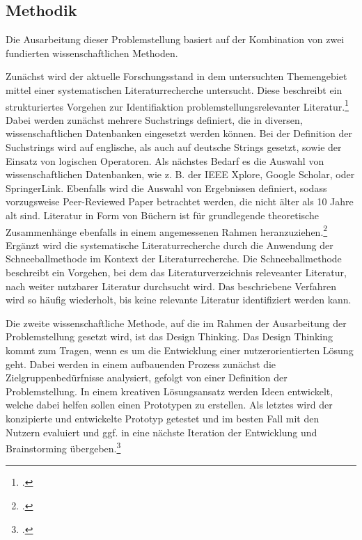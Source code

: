 \subsection{Methodik}
Die Ausarbeitung dieser Problemstellung basiert auf der Kombination von zwei fundierten wissenschaftlichen Methoden.

Zunächst wird der aktuelle Forschungsstand in dem untersuchten Themengebiet mittel einer systematischen Literaturrecherche untersucht.
Diese beschreibt ein strukturiertes Vorgehen zur Identifiaktion problemstellungsrelevanter Literatur.\footcite{brocke2015standing}
Dabei werden zunächst mehrere Suchstrings definiert, die in diversen, wissenschaftlichen Datenbanken eingesetzt werden können.
Bei der Definition der Suchstrings wird auf englische, als auch auf deutsche Strings gesetzt, sowie der Einsatz von logischen Operatoren.
Als nächstes Bedarf es die Auswahl von wissenschaftlichen Datenbanken, wie z. B. der IEEE Xplore, Google Scholar, oder SpringerLink.
Ebenfalls wird die Auswahl von Ergebnissen definiert, sodass vorzugsweise Peer-Reviewed Paper betrachtet werden, die nicht älter als 10 Jahre alt sind.
Literatur in Form von Büchern ist für grundlegende theoretische Zusammenhänge ebenfalls in einem angemessenen Rahmen heranzuziehen.\footcite{xiao2019guidance}
Ergänzt wird die systematische Literaturrecherche durch die Anwendung der Schneeballmethode im Kontext der Literaturrecherche.
Die Schneeballmethode beschreibt ein Vorgehen, bei dem das Literaturverzeichnis releveanter Literatur, nach weiter nutzbarer Literatur durchsucht wird.
Das beschriebene Verfahren wird so häufig wiederholt, bis keine relevante Literatur identifiziert werden kann.

Die zweite wissenschaftliche Methode, auf die im Rahmen der Ausarbeitung der Problemstellung gesetzt wird, ist das Design Thinking.
Das Design Thinking kommt zum Tragen, wenn es um die Entwicklung einer nutzerorientierten Lösung geht.
Dabei werden in einem aufbauenden Prozess zunächst die Zielgruppenbedürfnisse analysiert, gefolgt von einer Definition der Problemstellung.
In einem kreativen Lösungsansatz werden Ideen entwickelt, welche dabei helfen sollen einen Prototypen zu erstellen.
Als letztes wird der konzipierte und entwickelte Prototyp getestet und im besten Fall mit den Nutzern evaluiert und ggf. in eine nächste Iteration der Entwicklung und Brainstorming übergeben.\footcite{heller2020design}